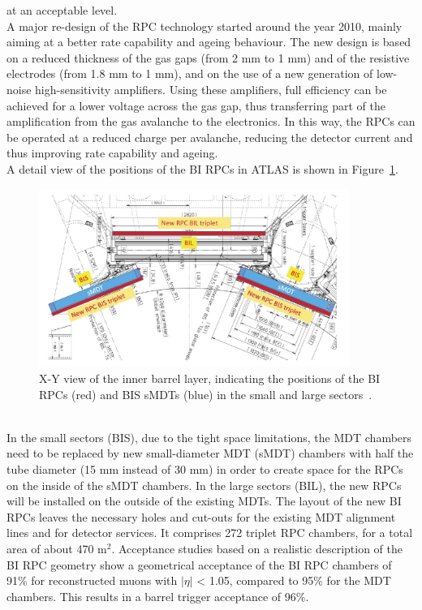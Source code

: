 at an acceptable level.\\
A major re-design of the RPC technology started around the year 2010, mainly aiming at a
better rate capability and ageing behaviour. The new design is based on a reduced thickness
of the gas gaps (from 2 mm to 1 mm) and of the resistive electrodes (from 1.8 mm to
1 mm), and on the use of a new generation of low-noise high-sensitivity amplifiers. Using
these amplifiers, full efficiency can be achieved for a lower voltage across the gas gap, thus
transferring part of the amplification from the gas avalanche to the electronics. In this way,
the RPCs can be operated at a reduced charge per avalanche, reducing the detector current
and thus improving rate capability and ageing.\\
A detail view of the positions of the BI RPCs in ATLAS is shown in Figure~\ref{fig:xy_BIRPC}.
\begin{figure}[!h]
	\centering
	\includegraphics[width=0.9\textwidth]{Chapters/CH3/figures/xy_BIRPC}
	\caption{X-Y view of the inner barrel layer, indicating the positions of the BI RPCs (red) and BIS
sMDTs (blue) in the small and large sectors~\cite{TDR}.}
	\label{fig:xy_BIRPC}
\end{figure}
\\In the small sectors (BIS), due to the tight space limitations, the MDT chambers need to be 
replaced by new small-diameter MDT (sMDT) chambers with half the tube diameter (15 mm 
instead of 30 mm) in order to create space for the RPCs on the inside of the sMDT chambers. 
In  the large sectors (BIL), the new RPCs will be installed on the outside of the existing MDTs. The
layout of the new BI RPCs leaves the necessary holes and cut-outs for the existing MDT
alignment lines and for detector services. It comprises 272 triplet RPC chambers, for a total
area of about 470 $\mathrm{m^{2}}$. Acceptance studies based on a realistic description of the BI RPC geometry show a geometrical acceptance of the BI RPC chambers of 91\% for reconstructed muons with $|\eta|$ < 1.05, compared to 95\%  for the MDT chambers. This results in a barrel trigger acceptance of 96\%.\\
